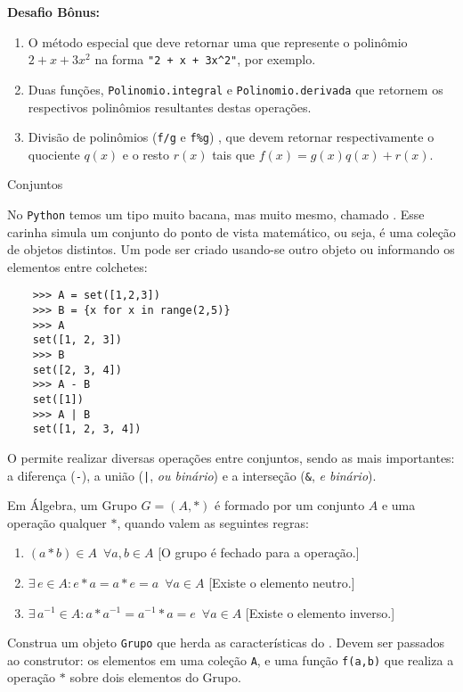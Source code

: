 \documentclass[12pt]{article}
\begin{document}
	\textbf{Desafio Bônus:}
	\begin{enumerate}
		\item O método especial  que deve retornar uma  que represente o polinômio $2 + x + 3x^{2}$ na forma \texttt{"2 + x + 3x\^{}2"}, por exemplo.
		\item Duas funções, \texttt{Polinomio.integral} e \texttt{Polinomio.derivada} que retornem os respectivos polinômios resultantes destas operações.
		
		\item Divisão de polinômios (\texttt{f/g} e \texttt{f\%g}) , que devem retornar respectivamente o quociente $q(x)$ e o resto $r(x)$ tais que $f(x) = g(x) q(x) + r(x)$.
	\end{enumerate}
	
	\begin{interlude}{Conjuntos}
	
	No \texttt{Python} temos um tipo muito bacana, mas muito mesmo, chamado . Esse carinha simula um conjunto do ponto de vista matemático, ou seja, é uma coleção de objetos distintos. Um  pode ser criado usando-se outro objeto ou informando os elementos entre colchetes:
	
	\begin{lstlisting}
	>>> A = set([1,2,3])
	>>> B = {x for x in range(2,5)}
	>>> A
	set([1, 2, 3])
	>>> B
	set([2, 3, 4])
	>>> A - B
	set([1])
	>>> A | B
	set([1, 2, 3, 4])
	\end{lstlisting}
	
	O  permite realizar diversas operações entre conjuntos, sendo as mais importantes: a diferença (\texttt{-}), a união (\texttt{|}, \emph{ou binário}) e a interseção (\texttt{\&}, \emph{e binário}). 
	
	\end{interlude}
	
	
	Em Álgebra, um Grupo $G = (A, \ast)$ é formado por um conjunto $A$ e uma operação qualquer $\ast$, quando valem as seguintes regras:
	
	\begin{enumerate}
		\item $(a \ast b) \in A \,\,\, \forall a,b \in A$ [O grupo é fechado para a operação.]
		\item $\exists \, e \in A : e \ast a = a \ast e = a \,\,\, \forall a \in A$ [Existe o elemento neutro.]
		\item $\exists \, a^{-1} \in A : a \ast a^{-1} = a^{-1} \ast a = e \,\,\, \forall a \in A$ [Existe o elemento inverso.]\\
	\end{enumerate}
	Construa um objeto \texttt{Grupo} que herda as características do . Devem ser passados ao construtor: os elementos em uma coleção \texttt{A}, e uma função \texttt{f(a,b)} que realiza a operação $\ast$ sobre dois elementos do Grupo.
	
\end{document}
